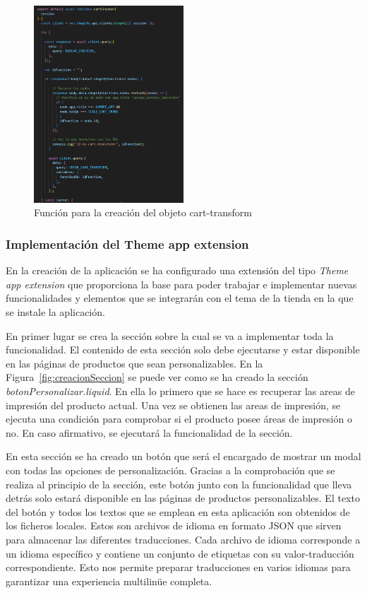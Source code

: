 \documentclass[12pt]{article}
\begin{document}
\begin{figure}[ht]
    \centering
    \includegraphics[width=0.5\textwidth]{imagenes-back/funcionCartCreator.png}
    \caption{\label{fig:funcioncartCreat} Función para la creación del objeto cart-transform}
    \vspace{\fill}
\end{figure}

\clearpage
\subsubsection{Implementación del Theme app extension}

En la creación de la aplicación se ha configurado una extensión del tipo \textit{Theme app extension} que proporciona la base para poder trabajar e implementar nuevas funcionalidades
y elementos que se integrarán con el tema de la tienda en la que se instale la aplicación.

En primer lugar se crea la sección sobre la cual se va a implementar toda la funcionalidad. El contenido de esta sección solo debe ejecutarse y estar disponible en las 
páginas de productos que sean personalizables. En la Figura~\ref{fig:creacionSeccion} se puede ver como se ha creado la sección \textit{botonPersonalizar.liquid}. En ella lo primero
que se hace es recuperar las areas de impresión del producto actual. Una vez se obtienen las areas de impresión, se ejecuta una condición para comprobar
si el producto posee áreas de impresión o no. En caso afirmativo, se ejecutará la funcionalidad de la sección.

En esta sección se ha creado un botón que será el encargado de mostrar un modal con todas las opciones de personalización. Gracias a la comprobación
que se realiza al principio de la sección, este botón junto con la funcionalidad que lleva detrás solo estará disponible en las páginas de productos personalizables.
El texto del botón y todos los textos que se emplean en esta aplicación son obtenidos de los ficheros locales. Estos son archivos de idioma en formato 
JSON que sirven para almacenar las diferentes traducciones. Cada archivo de idioma corresponde a un idioma específico y contiene un conjunto de etiquetas con su valor-traducción correspondiente. Esto nos 
permite preparar traducciones en varios idiomas para garantizar una experiencia multilinüe completa.
\end{document}
